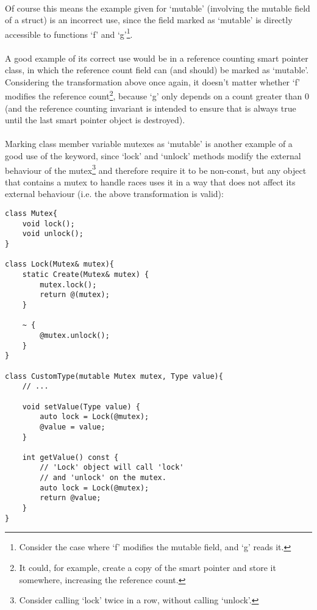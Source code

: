 \documentclass[12pt,twoside,notitlepage]{report}
\begin{document}
\paragraph{}
Of course this means the example given for `mutable' (involving the mutable field of a struct) is an incorrect use, since the field marked as `mutable' is directly accessible to functions `f' and `g'\footnote{Consider the case where `f' modifies the mutable field, and `g' reads it.}.

\paragraph{}
A good example of its correct use would be in a reference counting smart pointer class, in which the reference count field can (and should) be marked as `mutable'. Considering the transformation above once again, it doesn't matter whether `f' modifies the reference count\footnote{It could, for example, create a copy of the smart pointer and store it somewhere, increasing the reference count.}, because `g' only depends on a count greater than 0 (and the reference counting invariant is intended to ensure that is always true until the last smart pointer object is destroyed).

\paragraph{}
Marking class member variable mutexes as `mutable' is another example of a good use of the keyword, since `lock' and `unlock' methods modify the external behaviour of the mutex\footnote{Consider calling `lock' twice in a row, without calling `unlock'.} and therefore require it to be non-const, but any object that contains a mutex to handle races uses it in a way that does not affect its external behaviour (i.e. the above transformation is valid):

\begin{lstlisting}
class Mutex{
	void lock();
	void unlock();
}

class Lock(Mutex& mutex){
	static Create(Mutex& mutex) {
		mutex.lock();
		return @(mutex);
	}
	
	~ {
		@mutex.unlock();
	}
}

class CustomType(mutable Mutex mutex, Type value){
	// ...
	
	void setValue(Type value) {
		auto lock = Lock(@mutex);
		@value = value;
	}

	int getValue() const {
		// 'Lock' object will call 'lock'
		// and 'unlock' on the mutex.
		auto lock = Lock(@mutex);
		return @value;
	}
}
\end{lstlisting}
\end{document}
